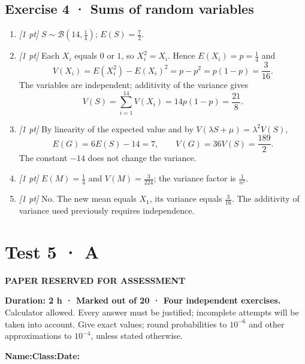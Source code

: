 \subsection*{Exercise 4 · Sums of random variables}\begin{enumerate}

\item \textit{[1 pt]} $S\sim\mathcal B(14,\frac{1}{4})$; $E(S)=\frac{7}{2}$.

\item \textit{[1 pt]} Each $X_i$ equals $0$ or $1$, so $X_i^2=X_i$. Hence $E(X_i)=p=\frac{1}{4}$ and
\[V(X_i)=E(X_i^2)-E(X_i)^2=p-p^2=p(1-p)=\frac{3}{16}.\]
The variables are independent; additivity of the variance gives
\[V(S)=\sum_{i=1}^{14}V(X_i)=14p(1-p)=\frac{21}{8}.\]

\item \textit{[1 pt]} By linearity of the expected value and by $V(\lambda S+\mu)=\lambda^2V(S)$,
\[E(G)=6E(S)-14=7,\qquad V(G)=36V(S)=\frac{189}{2}.\]
The constant $-14$ does not change the variance.

\item \textit{[1 pt]} $E(M)=\frac{1}{4}$ and $V(M)=\frac{3}{224}$; the variance factor is $\frac{1}{n^2}$.

\item \textit{[1 pt]} No. The new mean equals $X_1$, its variance equals $\frac{3}{16}$. The additivity of variance used previously requires independence.

\end{enumerate}

\fi

\ifprof

\clearpage{}\label{sujet:7-3}

\section*{Test 5 · A}

{\sffamily\bfseries\color{amber}PAPER RESERVED FOR ASSESSMENT\par}

\textbf{Duration: 2 h · Marked out of 20 · Four independent exercises.}\\Calculator allowed. Every answer must be justified; incomplete attempts will be taken into account. Give exact values; round probabilities to $10^{-6}$ and other approximations to $10^{-4}$, unless stated otherwise.

\smallskip\textbf{Name:}\enspace\dotfill\quad\textbf{Class:}\enspace\dotfill\quad\textbf{Date:}\enspace\dotfill

